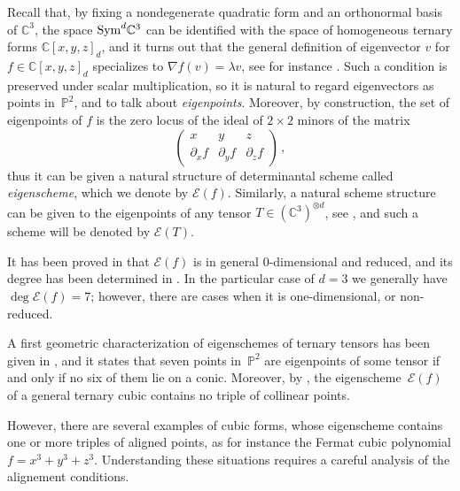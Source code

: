 \documentclass[a4paper, 11pt, reqno]{amsart}
\theoremstyle{plain}
\theoremstyle{definition}
\newcommand{\C}{\mathbb{C}}
\newcommand{\p}{\mathbb{P}}
\newcommand{\Eig}[1]{\mathcal{E}\!\left( {#1} \right)}
\begin{document}
Recall that, by fixing a nondegenerate quadratic form and an orthonormal basis of $\C^3$, the space ${\rm Sym}^d \C^3$ can be identified with the space of homogeneous ternary forms
$\C[x,y,z]_d$, and it turns out that the general definition of eigenvector $v$ for $f \in \C[x,y,z]_d$ specializes 
to $\nabla f (v)=\lambda v$, see for instance \cite[Section 1]{ASS}.
Such a condition is preserved under scalar multiplication, 
so it is natural to regard eigenvectors as points in~$\p^2$, and to talk about \emph{eigenpoints}. Moreover, 
by construction, the set of eigenpoints of $f$ is the zero locus of the ideal of $2 \times 2$ minors of the matrix%
\begin{equation}
\label{eq:def_matrix}
\begin{pmatrix}
    x & y & z \\
    \partial_x f  & \partial_y f & \partial_z f 
\end{pmatrix} \,,
\end{equation}
%
thus it can be given a natural structure of determinantal scheme called \emph{eigenscheme}, which we denote by $\Eig{f}$. Similarly, a natural scheme structure can be given to the eigenpoints of any
tensor $T \in (\C^3)^{\otimes d}$, see \cite[Section 1]{ASS}, and such a scheme will be denoted by $\Eig{T}$.

It has been proved in \cite[Corollary 5.8]{Abo} that $\Eig{f}$ is in general $0$-dimensional and reduced, and its degree has been determined in \cite[Theorem 2.1]{CartSturm}.
In the particular case of $d=3$ we generally have
$\deg \Eig{f}=7$; however,
 there are cases when it is one-dimensional, or non-reduced.

A first geometric characterization of eigenschemes of ternary tensors has been given in
\cite[Theorem 5.1]{ASS}, and it states that seven points in~$\p^2$ are eigenpoints of some tensor if and only if no six of them lie on a conic.
Moreover, by \cite[Theorem 5.7]{BGV},
the eigenscheme~$\Eig{f}$ of a general ternary cubic contains no triple of collinear points.

However, there are several examples of cubic forms, whose eigenscheme contains one or more triples of aligned points, as for instance the Fermat cubic polynomial $f=x^3+y^3+z^3$.
Understanding these situations requires a careful analysis of the alignement conditions.
\end{document}
